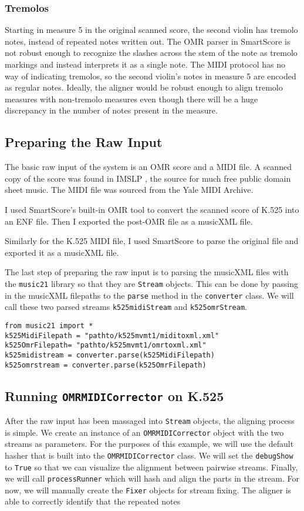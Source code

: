 \subsubsection{Tremolos}
Starting in measure 5 in the original scanned score, the second violin has tremolo notes, instead of repeated  notes written out. The OMR parser in SmartScore is not robust enough to recognize the slashes across the stem of the note as tremolo markings and instead interprets it as a single note. The MIDI protocol has no way of indicating tremolos, so the second violin's notes in measure 5 are encoded as regular  notes. Ideally, the aligner would be robust enough to align tremolo measures with non-tremolo measures even though there will be a huge discrepancy in the number of notes present in the measure.

\subsection{Preparing the Raw Input}
The basic raw input of the system is an OMR score and a MIDI file. A scanned copy of the score was found in IMSLP \cite{k525}, the source for much free public domain sheet music. The MIDI file was sourced from the Yale MIDI Archive. 

I used SmartScore's built-in OMR tool to convert the scanned score of K.525 into an ENF file. Then I exported the post-OMR file as a musicXML file.

Similarly for the K.525 MIDI file, I used SmartScore to parse the original file and exported it as a musicXML file. 

The last step of preparing the raw input is to parsing the musicXML files with the \texttt{music21} library so that they are \texttt{Stream} objects. This can be done by passing in the musicXML filepaths to the \texttt{parse} method in the \texttt{converter} class. We will call these two parsed streams \texttt{k525midiStream} and \texttt{k525omrStream}. 
\begin{verbatim}
from music21 import *
k525MidiFilepath = "pathto/k525mvmt1/miditoxml.xml"
k525OmrFilepath= "pathto/k525mvmt1/omrtoxml.xml"
k525midistream = converter.parse(k525MidiFilepath)
k525omrstream = converter.parse(k525OmrFilepath)
\end{verbatim}
\subsection{Running \texttt{OMRMIDICorrector} on K.525}
After the raw input has been massaged into \texttt{Stream} objects, the aligning process is simple. We create an instance of an \texttt{OMRMIDICorrector} object with the two streams as parameters. For the purposes of this example, we will use the default hasher that is built into the \texttt{OMRMIDICorrector} class. We will set the \texttt{debugShow} to \texttt{True} so that we can visualize the alignment between pairwise streams. Finally, we will call \texttt{processRunner} which will hash and align the parts in the stream. For now, we will manually create the \texttt{Fixer} objects for stream fixing. The aligner is able to correctly identify that the repeated  notes 

